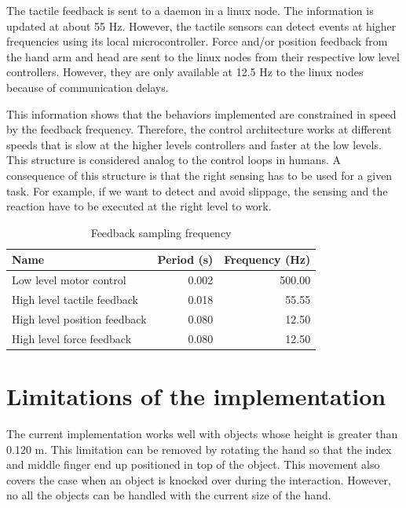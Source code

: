 The tactile feedback is sent to a daemon in a linux node. The
information is updated at about 55 Hz. However, the tactile
sensors can detect events at higher frequencies using its local
microcontroller. Force and/or position feedback from the hand arm
and head are sent to the linux nodes from their respective low
level controllers. However, they are only available at 12.5 Hz to
the linux nodes because of communication delays.

This information shows that the behaviors implemented are
constrained in speed by the feedback frequency. Therefore, the
control architecture works at different speeds that is slow at the
higher levels controllers and faster at the low levels. This
structure is considered analog to the control loops in humans. A
consequence of this structure is that the right sensing has to be
used for a given task. For example, if we want to detect and avoid
slippage, the sensing and the reaction have to be executed at the
right level to work.


\begin{table}[htb]
  \caption[Feedback sampling frequency]{Feedback sampling frequency}
  \label{tab:feedback}
  \centering
  \begin{tabular}{|l|r|r|}
    \hline
    Name& Period (s)&Frequency (Hz)\\
    \hline
    Low level motor control&0.002&500.00\\
    High level tactile feedback & 0.018 & 55.55\\
    High level position feedback &0.080 & 12.50\\
    High level force feedback &0.080 & 12.50\\

    \hline
  \end{tabular}
\end{table}


\section{Limitations of the implementation}
\label{sec:imp:limitations}


 The current implementation works well
with objects whose height is greater than 0.120 m. This limitation
can be removed by rotating the hand so that the index and middle
finger end up positioned in top of the object. This movement also
covers the case when an object is knocked over during the
interaction. However, no all the objects can be handled with the
current size of the hand.

